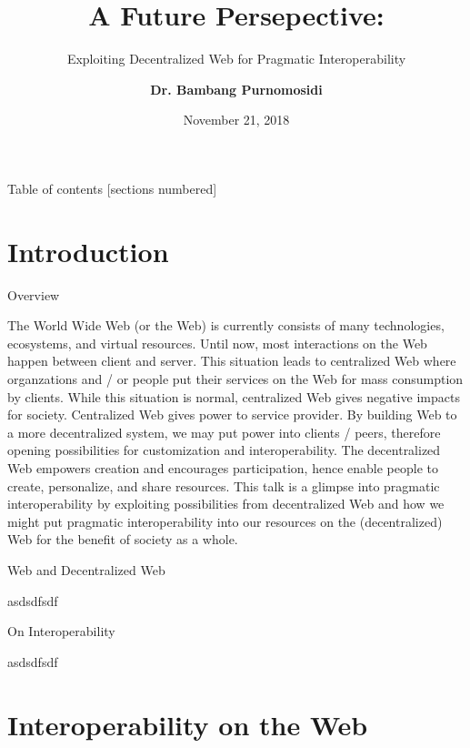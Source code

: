 \documentclass[10pt]{beamer}
\title{A Future Persepective:}
\subtitle{Exploiting Decentralized Web for Pragmatic Interoperability}
\date{November 21, 2018}
\author{\textbf{Dr. Bambang Purnomosidi}}
\institute{Informatics Engineering Department\\STMIK AKAKOM}
\begin{document}
\maketitle

\begin{frame}{Table of contents}
  [sections numbered]
  \tableofcontents[hideallsubsections]
\end{frame}

\section{Introduction}

\begin{frame}[fragile]{Overview}

  The World Wide Web (or the Web) is currently consists of many technologies, ecosystems, and virtual resources. Until now, most interactions on the Web happen between client and server. This situation leads to centralized Web where organzations and / or people put their services on the Web for mass consumption by clients. While this situation is normal, centralized Web gives negative impacts for society. Centralized Web gives power to service provider. By building Web to a more decentralized system, we may put power into clients / peers, therefore opening possibilities for customization and interoperability. The decentralized Web empowers creation and encourages participation, hence enable people to create, personalize, and share resources. This talk is a glimpse into pragmatic interoperability by exploiting possibilities from decentralized Web and how we might put pragmatic interoperability into our resources on the (decentralized) Web for the benefit of society as a whole.

\end{frame}

\begin{frame}[allowframebreaks]{Web and Decentralized Web}

  asdsdfsdf

\end{frame}

\begin{frame}[fragile]{On Interoperability}

  asdsdfsdf

\end{frame}

\section{Interoperability on the Web}
\end{document}
